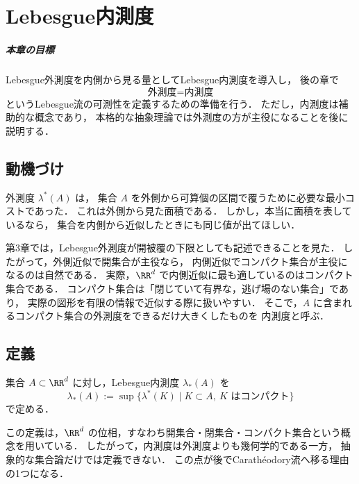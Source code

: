 \chapter{Lebesgue内測度}

\paragraph{本章の目標}
Lebesgue外測度を内側から見る量としてLebesgue内測度を導入し，
後の章で
\[
\text{外測度}=\text{内測度}
\]
というLebesgue流の可測性を定義するための準備を行う．
ただし，内測度は補助的な概念であり，
本格的な抽象理論では外測度の方が主役になることを後に説明する．

\section{動機づけ}

外測度 $\lambda^*(A)$ は，
集合 $A$ を外側から可算個の区間で覆うために必要な最小コストであった．
これは外側から見た面積である．
しかし，本当に面積を表しているなら，
集合を内側から近似したときにも同じ値が出てほしい．

第3章では，Lebesgue外測度が開被覆の下限としても記述できることを見た．
したがって，外側近似で開集合が主役なら，
内側近似でコンパクト集合が主役になるのは自然である．
実際，$\RR^d$ で内側近似に最も適しているのはコンパクト集合である．
コンパクト集合は「閉じていて有界な，逃げ場のない集合」であり，
実際の図形を有限の情報で近似する際に扱いやすい．
そこで，$A$ に含まれるコンパクト集合の外測度をできるだけ大きくしたものを
内測度と呼ぶ．

\section{定義}

\begin{definition}[Lebesgue内測度]
集合 $A \subset \RR^d$ に対し，Lebesgue内測度 $\lambda_*(A)$ を
\[
\lambda_*(A)
:=
\sup\{\lambda^*(K) \mid K \subset A,\ K \text{ はコンパクト}\}
\]
で定める．
\end{definition}

\begin{remark}
この定義は，$\RR^d$ の位相，すなわち開集合・閉集合・コンパクト集合という概念を用いている．
したがって，内測度は外測度よりも幾何学的である一方，
抽象的な集合論だけでは定義できない．
この点が後でCarathéodory流へ移る理由の1つになる．
\end{remark}

